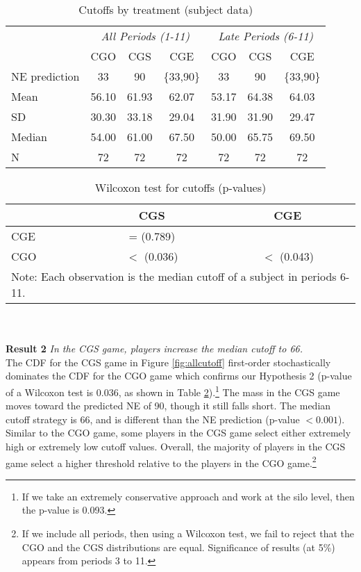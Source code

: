 \documentclass[12pt, letterpaper]{article}
\theoremstyle{plain}
\begin{document}
\begin{table}[!ht]
\centering\caption{Cutoffs by treatment (subject data)}

\begin{tabular}{lccc|ccc}
\hline
& \multicolumn{3}{c}{\textit{All Periods (1-11)}} & \multicolumn{3}{c}{\textit{Late Periods (6-11)}}\\
 & CGO & CGS  & CGE  & CGO & CGS  & CGE\\
  \hline
  NE prediction & 33 & 90 & \{33,90\} & 33 & 90 & \{33,90\}\\
  Mean & 56.10 & 61.93 & 62.07 &  53.17 &  64.38 & 64.03 \\
  SD & 30.30 & 33.18 & 29.04 &  31.90 &  31.90 & 29.47 \\
  Median & 54.00 & 61.00 & 67.50 &  50.00 &  65.75 & 69.50 \\
    N & 72 &  72 & 72 & 72 &  72 & 72 \\
\hline
\end{tabular}

\label{tab(cutoffs)}
\end{table}
\begin{table}[ht]
\centering\caption{ Wilcoxon test for cutoffs (p-values)}

\begin{tabular}{l|cc}
& CGS & CGE \\
\hline
CGE & = (0.789)& \\
CGO & $<$ (0.036) & $<$ (0.043)\\
\hline
 \multicolumn{3}{p{.35\textwidth}}{\scriptsize{Note: Each observation is the median cutoff of a subject in periods 6-11.}}\\ 
\end{tabular}

\label{tab(cutoff-pvalue)}
\end{table}
\\
\\
\noindent \textbf{Result 2}
\textit{In the CGS game, players increase the median cutoff to 66.}\\

The CDF for the CGS game in Figure \ref{fig:allcutoff} first-order stochastically dominates the CDF for the CGO game which confirms our Hypothesis 2 (p-value of a Wilcoxon test is 0.036, as shown in Table \ref{tab(cutoff-pvalue)}).\footnote{If we take an extremely conservative approach and work at the silo level, then the p-value is 0.093.} The mass in the CGS game moves toward the predicted NE of 90, though it still falls short. The median cutoff strategy is 66, and is different than the NE prediction (p-value $< 0.001$).  Similar to the CGO game, some players in the CGS game select either extremely high or extremely low cutoff values. Overall, the majority of players in the CGS game select a higher threshold relative to the players in the CGO game.\footnote{If we include all periods, then using a Wilcoxon test, we fail to reject that the CGO and the CGS distributions are equal. Significance of results (at 5\%) appears from periods 3 to 11.}\\
\end{document}
